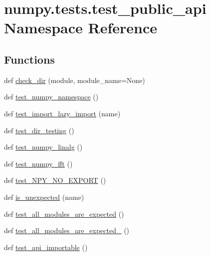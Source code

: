 \hypertarget{namespacenumpy_1_1tests_1_1test__public__api}{}\section{numpy.\+tests.\+test\+\_\+public\+\_\+api Namespace Reference}
\label{namespacenumpy_1_1tests_1_1test__public__api}
\subsection*{Functions}
\begin{DoxyCompactItemize}
\item 
def \hyperlink{namespacenumpy_1_1tests_1_1test__public__api_aca631c7663d90d8e193fa102fb283d21}{check\+\_\+dir} (module, module\+\_\+name=None)
\item 
def \hyperlink{namespacenumpy_1_1tests_1_1test__public__api_ac91c51bb3f22a2b709dedf2264c04cf7}{test\+\_\+numpy\+\_\+namespace} ()
\item 
def \hyperlink{namespacenumpy_1_1tests_1_1test__public__api_ac2773cb5b34729d04d3c73738c1664c3}{test\+\_\+import\+\_\+lazy\+\_\+import} (name)
\item 
def \hyperlink{namespacenumpy_1_1tests_1_1test__public__api_a9349a6766aea5243fb6573d8d23448fe}{test\+\_\+dir\+\_\+testing} ()
\item 
def \hyperlink{namespacenumpy_1_1tests_1_1test__public__api_a3c3ce2dbe9d7cbf21696b38d51e3a9be}{test\+\_\+numpy\+\_\+linalg} ()
\item 
def \hyperlink{namespacenumpy_1_1tests_1_1test__public__api_a21e4469093d30b5b5d404c23e58bbcc8}{test\+\_\+numpy\+\_\+fft} ()
\item 
def \hyperlink{namespacenumpy_1_1tests_1_1test__public__api_a646be176fa180d60bd077859d961c899}{test\+\_\+\+N\+P\+Y\+\_\+\+N\+O\+\_\+\+E\+X\+P\+O\+RT} ()
\item 
def \hyperlink{namespacenumpy_1_1tests_1_1test__public__api_a63f4f265b45ad414d6761ca28116b237}{is\+\_\+unexpected} (name)
\item 
def \hyperlink{namespacenumpy_1_1tests_1_1test__public__api_a5ddfc69870fb0fa1aabbeee8d8b8df02}{test\+\_\+all\+\_\+modules\+\_\+are\+\_\+expected} ()
\item 
def \hyperlink{namespacenumpy_1_1tests_1_1test__public__api_a7eced71f62dbdc80aeadcbc1a50f5400}{test\+\_\+all\+\_\+modules\+\_\+are\+\_\+expected\+\_} ()
\item 
def \hyperlink{namespacenumpy_1_1tests_1_1test__public__api_a8d3ac02fa4390cfdd0099d874c7bd74f}{test\+\_\+api\+\_\+importable} ()
\end{DoxyCompactItemize}
